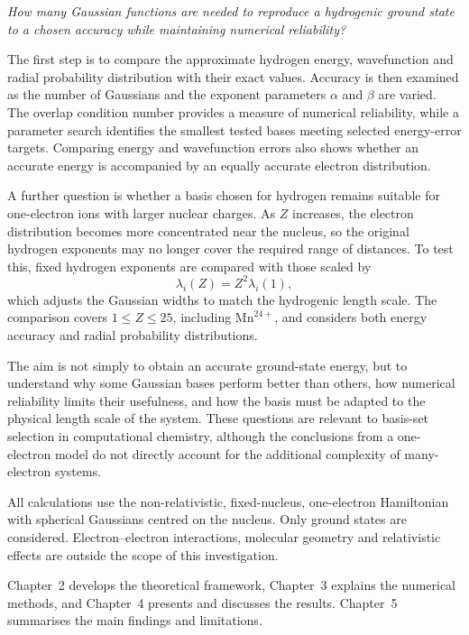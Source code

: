 \emph{How many Gaussian functions are needed
to reproduce a hydrogenic ground state to
a chosen accuracy while maintaining
numerical reliability?}

The first step is to compare the approximate
hydrogen energy, wavefunction and radial
probability distribution with their exact
values. Accuracy is then examined as the
number of Gaussians and the exponent parameters
$\alpha$ and $\beta$ are varied. The overlap
condition number provides a measure of numerical
reliability, while a parameter search identifies
the smallest tested bases meeting selected
energy-error targets. Comparing energy and
wavefunction errors also shows whether an
accurate energy is accompanied by an equally
accurate electron distribution.

A further question is whether a basis chosen
for hydrogen remains suitable for one-electron
ions with larger nuclear charges. As $Z$
increases, the electron distribution becomes
more concentrated near the nucleus, so the
original hydrogen exponents may no longer
cover the required range of distances.
To test this, fixed hydrogen exponents
are compared with those scaled by
\begin{equation}
    \lambda_i(Z)=Z^2\lambda_i(1),
    \label{eq:intro_scaling}
\end{equation}
which adjusts the Gaussian widths to match
the hydrogenic length scale. The comparison
covers $1\leq Z\leq25$, including
$\mathrm{Mn}^{24+}$, and considers both energy
accuracy and radial probability distributions.

The aim is not simply to obtain an accurate
ground-state energy, but to understand why
some Gaussian bases perform better than
others, how numerical reliability limits
their usefulness, and how the basis must
be adapted to the physical length scale
of the system. These questions are relevant
to basis-set selection in computational
chemistry, although the conclusions from
a one-electron model do not directly account
for the additional complexity of
many-electron systems.

All calculations use the non-relativistic,
fixed-nucleus, one-electron Hamiltonian
with spherical Gaussians centred on the
nucleus. Only ground states are considered.
Electron--electron interactions, molecular
geometry and relativistic effects are
outside the scope of this investigation.

Chapter~2 develops the theoretical framework,
Chapter~3 explains the numerical methods,
and Chapter~4 presents and discusses the
results. Chapter~5 summarises the main
findings and limitations.
